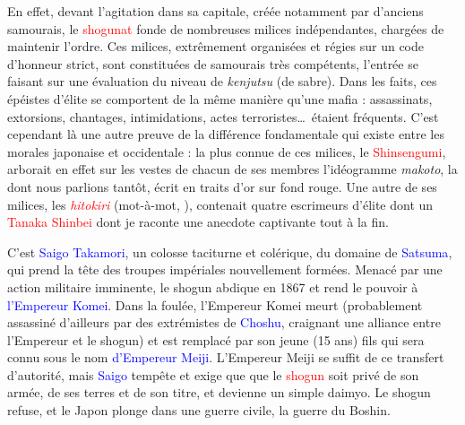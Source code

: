 En effet, devant l'agitation dans sa capitale, créée notamment par d'anciens
samourais, le \textcolor{red}{shogunat} fonde de nombreuses milices
indépendantes, chargées de maintenir l'ordre. Ces milices, extrêmement
organisées et régies sur un code d'honneur strict, sont constituées de
samourais très compétents, l'entrée se faisant sur une évaluation du niveau de
\emph{kenjutsu} (de sabre). Dans les faits, ces épéistes d'élite se comportent
de la même manière qu'une mafia : assassinats, extorsions, chantages,
intimidations, actes terroristes\dots\ étaient fréquents. C'est cependant là
une autre preuve de la différence fondamentale qui existe entre les morales
japonaise et occidentale : la plus connue de ces milices, le
\textcolor{red}{Shinsengumi}, arborait en effet sur les vestes de chacun de
ses membres l'idéogramme \emph{makoto}, la  dont nous parlions
tantôt, écrit en traits d'or sur fond rouge. Une autre de ses milices, les
\emph{\textcolor{red}{hitokiri}} (mot-à-mot, ),
contenait quatre escrimeurs d'élite dont un \textcolor{red}{Tanaka Shinbei}
dont je raconte une anecdote captivante tout à la fin.

C'est \textcolor{blue}{Saigo Takamori}, un colosse taciturne et colérique, du
domaine de \textcolor{blue}{Satsuma}, qui prend la tête des troupes impériales
nouvellement formées. Menacé par une action militaire imminente, le shogun
abdique en 1867 et rend le pouvoir à \textcolor{blue}{l'Empereur Komei}. Dans
la foulée, l'Empereur Komei meurt (probablement assassiné d'ailleurs par des
extrémistes de \textcolor{blue}{Choshu}, craignant une alliance entre
l'Empereur et le shogun) et est remplacé par son jeune (15 ans) fils qui sera
connu sous le nom \textcolor{blue}{d'Empereur Meiji}. L'Empereur Meiji se
suffit de ce transfert d'autorité, mais \textcolor{blue}{Saigo} tempête et
exige que que le \textcolor{red}{shogun} soit privé de son armée, de ses terres
et de son titre, et devienne un simple daimyo. Le shogun refuse, et le Japon
plonge dans une guerre civile, la guerre du Boshin.

